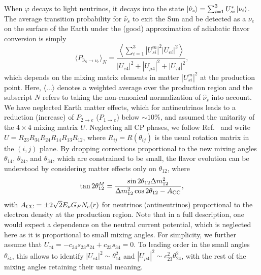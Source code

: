 \documentclass[
reprint,
superscriptaddress,
showpacs,
preprintnumbers,
nofootinbib,
nobibnotes,
amsmath,
amssymb, 
aps,
prd,
floatfix
]{revtex4-1}
\renewcommand{\phi}{\varphi}
\begin{document}
When $\phi$ decays to light neutrinos, it decays into the state $\ket{\hat{\nu}_s} = \sum_{i=1}^3 U_{s i}^* \ket{\nu_i}$. The average transition probability for $\hat{\nu}_s$ to exit the Sun and be detected as a $\nu_e$ on the surface of the Earth under the (good) approximation of adiabatic flavor conversion is simply 
\begin{equation}\label{eq:pse}
    \langle P_{\hat{\nu}_S\to \nu_e} \rangle_N = \frac{ \left\langle\sum_{i=1}^3 |U_{si}^m|^2|U_{ei}|^2\right\rangle}{|U_{e 4}|^2+|U_{\mu 4}|^2+|U_{\tau 4}|^2},
\end{equation}
which depends on the mixing matrix elements in matter $|U_{si}^m|^2$ at the production point. Here, $\langle \dots \rangle$ denotes a weighted average over the production region and the subscript $N$ refers to taking the non-canonical normalization of $\hat{\nu}_s$ into account. We have neglected Earth matter effects, which for antineutrinos leads to a reduction (increase) of $P_{2\to e}$ ($P_{1\to e}$) below $\sim10\%$, and assumed the unitarity of the $4\times4$ mixing matrix $U$. Neglecting all CP phases, we follow Ref.~\cite{Palazzo:2011rj} and write $U = R_{23} R_{34}R_{24}R_{14} R_{13} R_{12}$, where $R_{ij}=R(\theta_{ij})$ is the usual rotation matrix in the $(i,j)$ plane. By dropping corrections proportional to the new mixing angles $\theta_{14}$, $\theta_{24}$, and $\theta_{34}$, which are constrained to be small, the flavor evolution can be understood by considering matter effects only on $\theta_{12}$, where
\begin{equation}
    \tan{2\theta^M_{12}} = \frac{\sin{2 \theta_{12}} \Delta m^2_{12} }{\Delta m^2_{12} \cos{2 \theta_{12}} - A_{\rm CC}},
\end{equation}
with $A_{\rm CC} = \pm 2\sqrt{2} E_\nu G_F N_e(r)$ for neutrinos (antineutrinos) proportional to the electron density at the production region. Note that in a full description, one would expect a dependence on the neutral current potential, which is neglected here as it is proportional to small mixing angles. For simplicity, we further assume that $U_{\tau 4}=-c_{34}s_{23}s_{24}+c_{23}s_{34}=0$. To leading order in the small angles $\theta_{i4}$, this allows to identify $|U_{e4}|^2\sim \theta_{14}^2$ and $|U_{\mu4}|^2\sim c_{23}^2\theta_{24}^2$, with the rest of the mixing angles retaining their usual meaning.
\end{document}
